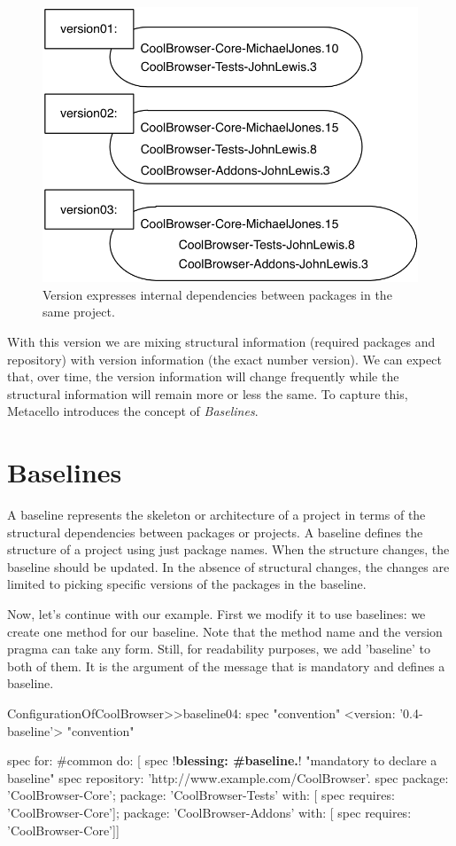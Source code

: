 \documentclass[a4paper,10pt,twoside]{book}
\begin{document}
\begin{figure}
\begin{center}
\includegraphics[width=0.6\linewidth]{version03}
\caption{Version  expresses internal dependencies between packages in the same project.\label{fig:version03}}
\end{center}
\end{figure} 


With this version we are mixing structural information (required packages and repository) with version information (the exact number version). 
We can expect that, over time, the version information will change frequently while the structural information will remain more or less the same. 
To capture this, Metacello introduces the concept of \emph{Baselines}.


\section{Baselines}
A baseline represents the skeleton or architecture of a project in terms of the structural dependencies between packages or projects. A baseline defines the structure of a project using just package names. When the structure changes, the baseline should be updated. In the absence of structural changes, the changes are limited to picking specific versions of the packages in the baseline.

Now, let's continue with our example. First we modify it to use baselines: we create one method for our baseline. Note that the method name and the version pragma can take any form. Still, for readability purposes, we add 'baseline' to both of them.
It is the argument of the  message that is mandatory and defines a baseline. 
\needspace{17ex}
\begin{code}{}
ConfigurationOfCoolBrowser>>baseline04: spec 				"convention"
       <version: '0.4-baseline'> 					              		"convention"
       
       spec for: #common do: [
              spec !\textbf{blessing: \#baseline.}!    "mandatory to declare a baseline"
              spec repository: 'http://www.example.com/CoolBrowser'.
              spec 
                  package: 'CoolBrowser-Core';
                  package: 'CoolBrowser-Tests' with: [ spec requires: 'CoolBrowser-Core'];
                  package: 'CoolBrowser-Addons' with: [ spec requires: 'CoolBrowser-Core']]
\end{code}
\end{document}
